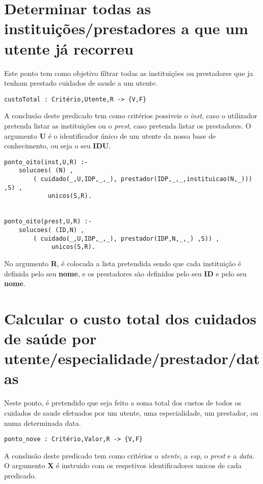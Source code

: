 \documentclass{report}
\def\titulo#1{\section{#1}}
\begin{document}
\titulo{Determinar todas as instituições/prestadores a que um utente já recorreu}

Este ponto tem como objetivo filtrar todas as instituições ou prestadores que ja tenham prestado cuidados de saude a um utente.


\begin{verbatim}
custoTotal : Critério,Utente,R -> {V,F}
\end{verbatim}

A conclusão deste predicado tem como critérios possiveis o \textit{inst}, caso o utilizador pretenda listar as instituições ou o \textit{prest}, caso pretenda listar os prestadores. O argumento \textbf{U} é o identificador único de um utente da nossa base de conhecimento, ou seja o seu \textbf{IDU}. 


\begin{verbatim}
ponto_oito(inst,U,R) :- 
    solucoes( (N) , 
        ( cuidado(_,U,IDP,_,_), prestador(IDP,_,_,instituicao(N,_))) ,S) , 
            unicos(S,R).


ponto_oito(prest,U,R) :- 
    solucoes( (ID,N) , 
        ( cuidado(_,U,IDP,_,_), prestador(IDP,N,_,_) ,S)) ,
             unicos(S,R).
\end{verbatim}

No argumento \textbf{R}, é colocada a lista pretendida sendo que cada instituição é definida pelo seu \textbf{nome}, e os prestadores são definidos pelo seu \textbf{ID} e pelo seu \textbf{nome}.





















\titulo{Calcular o custo total dos cuidados de saúde por utente/especialidade/prestador/datas}

Neste ponto, é pretendido que seja feito a soma total dos custos de todos os cuidados de saude efetuados por um utente, uma especialidade, um prestador, ou numa determinada data.

\begin{verbatim}
ponto_nove : Critério,Valor,R -> {V,F}
\end{verbatim}

A conslusão deste predicado tem como critérios o \textit{utente}, a \textit{esp}, o \textit{prest} e a \textit{data}. O argumento \textbf{X} é instruido com os respetivos identificadores unicos de cada predicado.
\end{document}

